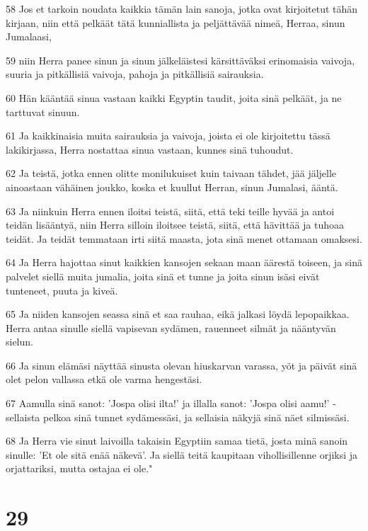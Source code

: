 \par 58 Jos et tarkoin noudata kaikkia tämän lain sanoja, jotka ovat kirjoitetut tähän kirjaan, niin että pelkäät tätä kunniallista ja peljättävää nimeä, Herraa, sinun Jumalaasi,
\par 59 niin Herra panee sinun ja sinun jälkeläistesi kärsittäväksi erinomaisia vaivoja, suuria ja pitkällisiä vaivoja, pahoja ja pitkällisiä sairauksia.
\par 60 Hän kääntää sinua vastaan kaikki Egyptin taudit, joita sinä pelkäät, ja ne tarttuvat sinuun.
\par 61 Ja kaikkinaisia muita sairauksia ja vaivoja, joista ei ole kirjoitettu tässä lakikirjassa, Herra nostattaa sinua vastaan, kunnes sinä tuhoudut.
\par 62 Ja teistä, jotka ennen olitte monilukuiset kuin taivaan tähdet, jää jäljelle ainoastaan vähäinen joukko, koska et kuullut Herran, sinun Jumalasi, ääntä.
\par 63 Ja niinkuin Herra ennen iloitsi teistä, siitä, että teki teille hyvää ja antoi teidän lisääntyä, niin Herra silloin iloitsee teistä, siitä, että hävittää ja tuhoaa teidät. Ja teidät temmataan irti siitä maasta, jota sinä menet ottamaan omaksesi.
\par 64 Ja Herra hajottaa sinut kaikkien kansojen sekaan maan äärestä toiseen, ja sinä palvelet siellä muita jumalia, joita sinä et tunne ja joita sinun isäsi eivät tunteneet, puuta ja kiveä.
\par 65 Ja niiden kansojen seassa sinä et saa rauhaa, eikä jalkasi löydä lepopaikkaa. Herra antaa sinulle siellä vapisevan sydämen, rauenneet silmät ja nääntyvän sielun.
\par 66 Ja sinun elämäsi näyttää sinusta olevan hiuskarvan varassa, yöt ja päivät sinä olet pelon vallassa etkä ole varma hengestäsi.
\par 67 Aamulla sinä sanot: 'Jospa olisi ilta!' ja illalla sanot: 'Jospa olisi aamu!' - sellaista pelkoa sinä tunnet sydämessäsi, ja sellaisia näkyjä sinä näet silmissäsi.
\par 68 Ja Herra vie sinut laivoilla takaisin Egyptiin samaa tietä, josta minä sanoin sinulle: 'Et ole sitä enää näkevä'. Ja siellä teitä kaupitaan vihollisillenne orjiksi ja orjattariksi, mutta ostajaa ei ole."

\chapter{29}

